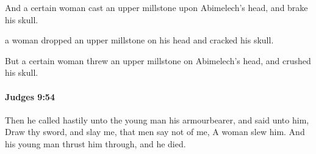 			\begin{versebox}
					\item[BHS] 
					\item[ASV] And a certain woman cast an upper millstone upon Abimelech's head, and brake his skull.
					\item[NIV] a woman dropped an upper millstone on his head and cracked his skull.
					\item[NRSV] But a certain woman threw an upper millstone on Abimelech’s head, and crushed his skull.
			\end{versebox}

		\paragraph{Judges 9:54} %
			\label{JUDGES-9-54}

			Then he called hastily unto the young man his armourbearer, and said unto him, Draw thy sword, and slay me, that men say not of me, A woman slew him. And his young man thrust him through, and he died.

